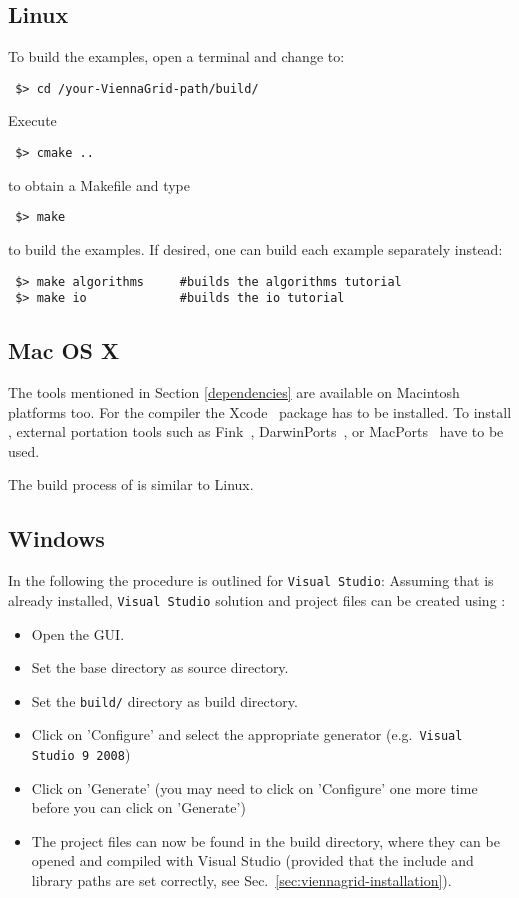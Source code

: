 \subsection{Linux}
To build the examples, open a terminal and change to:

\begin{lstlisting}
 $> cd /your-ViennaGrid-path/build/
\end{lstlisting}
Execute
\begin{lstlisting}
 $> cmake ..
\end{lstlisting}
to obtain a Makefile and type
\begin{lstlisting}
 $> make 
\end{lstlisting}
to build the examples. If desired, one can build each example separately instead:
\begin{lstlisting}
 $> make algorithms     #builds the algorithms tutorial
 $> make io             #builds the io tutorial
\end{lstlisting}


\subsection{Mac OS X}
\label{apple}
The tools mentioned in Section \ref{dependencies} are available on 
Macintosh platforms too. 
For the {\GCC} compiler the Xcode~\cite{xcode} package has to be installed.
To install {\CMake}, external portation tools such as
Fink~\cite{fink}, DarwinPorts~\cite{darwinports}, 
or MacPorts~\cite{macports} have to be used. 

The build process of {\ViennaGrid} is similar to Linux.

\subsection{Windows}
In the following the procedure is outlined for \texttt{Visual Studio}: Assuming
that {\CMake} is already installed, \texttt{Visual Studio} solution
and project files can be created using {\CMake}:
\begin{itemize}
\item Open the {\CMake} GUI.
\item Set the {\ViennaGrid} base directory as source directory.
\item Set the \texttt{build/} directory as build directory.
\item Click on 'Configure' and select the appropriate generator
(e.g.~\texttt{Visual Studio 9 2008})
\item Click on 'Generate' (you may need to click on 'Configure' one more time
before you can click on 'Generate')
\item The project files can now be found in the {\ViennaGrid} build directory,
where they can be opened and compiled with Visual Studio (provided that the
include and library paths are set correctly, see
Sec.~\ref{sec:viennagrid-installation}).
\end{itemize}

